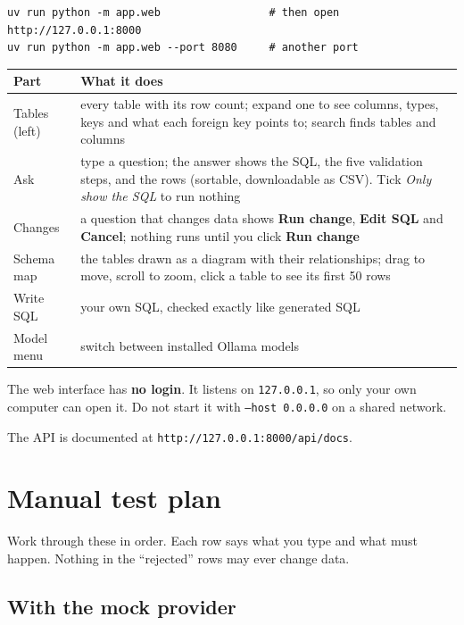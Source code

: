 \documentclass[11pt,a4paper]{article}
\newcommand{\note}[1]{%
  \par\smallskip\noindent\colorbox{warnbg}{\parbox{\dimexpr\linewidth-2\fboxsep}{\small #1}}\par\smallskip}
\begin{document}
\begin{lstlisting}
uv run python -m app.web                 # then open http://127.0.0.1:8000
uv run python -m app.web --port 8080     # another port
\end{lstlisting}

\begin{center}
\begin{tabular}{@{}p{3.2cm}p{11.4cm}@{}}
\toprule
\textbf{Part} & \textbf{What it does} \\
\midrule
Tables (left)  & every table with its row count; expand one to see columns, types, keys and what each foreign key points to; search finds tables and columns \\
Ask            & type a question; the answer shows the SQL, the five validation steps, and the rows (sortable, downloadable as CSV). Tick \emph{Only show the SQL} to run nothing \\
Changes        & a question that changes data shows \textbf{Run change}, \textbf{Edit SQL} and \textbf{Cancel}; nothing runs until you click \textbf{Run change} \\
Schema map     & the tables drawn as a diagram with their relationships; drag to move, scroll to zoom, click a table to see its first 50 rows \\
Write SQL      & your own SQL, checked exactly like generated SQL \\
Model menu     & switch between installed Ollama models \\
\bottomrule
\end{tabular}
\end{center}

\note{The web interface has \textbf{no login}. It listens on
\texttt{127.0.0.1}, so only your own computer can open it. Do not start it
with \texttt{--host 0.0.0.0} on a shared network.}

The API is documented at \texttt{http://127.0.0.1:8000/api/docs}.

\section{Manual test plan}

Work through these in order. Each row says what you type and what must
happen. Nothing in the ``rejected'' rows may ever change data.

\subsection{With the mock provider}
\label{sec:mock}
\end{document}
